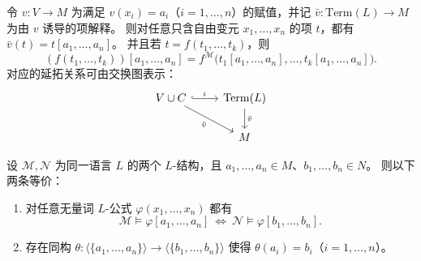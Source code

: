 \documentclass[lang=cn,a4paper,newtx,section]{elegantbook}
\begin{document}
\begin{remark}
令 $v:V\to M$ 为满足 $v(x_i)=a_i$（$i=1,\dots,n$）的赋值，并记 $\bar v:\mathrm{Term}(L)\to M$ 为由 $v$ 诱导的项解释。
则对任意只含自由变元 $x_1,\dots,x_n$ 的项 $t$，都有 $\bar v(t)=t[a_1,\dots,a_n]$。
并且若 $t=f(t_1,\dots,t_k)$，则
\[
  (f(t_1,\dots,t_k))[a_1,\dots,a_n]=f^{\mathcal M}\bigl(t_1[a_1,\dots,a_n],\dots,t_k[a_1,\dots,a_n]\bigr).
\]
对应的延拓关系可由交换图表示：
\[
\begin{tikzcd}
  V\cup C \arrow[r, hook, "\iota"] \arrow[dr, "\hat v"'] & \mathrm{Term}(L) \arrow[d, "\bar v"] \\
  & M
\end{tikzcd}
\]
\end{remark}

\begin{lemma}
\label{qf-type-equivalence-generated-substructure-isomorphism}
设 $\mathcal M,\mathcal N$ 为同一语言 $L$ 的两个 $L$-结构，且 $a_1,\dots,a_n\in M$、$b_1,\dots,b_n\in N$。
则以下两条等价：
\begin{enumerate}
  \item 对任意无量词 $L$-公式 $\varphi(x_1,\dots,x_n)$ 都有
  \[
    \mathcal M\models\varphi[a_1,\dots,a_n]\ \Longleftrightarrow\ \mathcal N\models\varphi[b_1,\dots,b_n].
  \]
  \item 存在同构 $\theta:\langle\{a_1,\dots,a_n\}\rangle\to\langle\{b_1,\dots,b_n\}\rangle$ 使得 $\theta(a_i)=b_i$（$i=1,\dots,n$）。
\end{enumerate}
\end{lemma}
\end{document}
